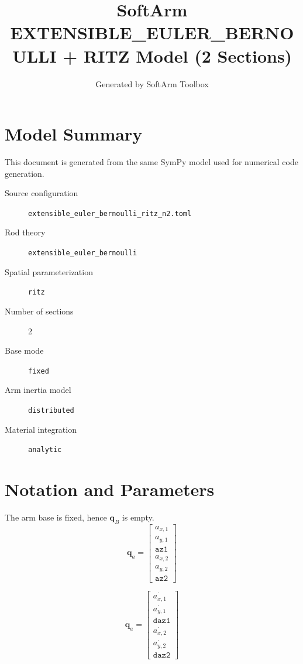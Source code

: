 \documentclass[11pt]{article}
\title{SoftArm EXTENSIBLE\_EULER\_BERNOULLI + RITZ Model (2 Sections)}
\author{Generated by SoftArm Toolbox}
\date{}
\begin{document}
\maketitle

\section{Model Summary}
This document is generated from the same SymPy model used for numerical code generation.
\begin{description}
\item[Source configuration] \texttt{extensible\_euler\_bernoulli\_ritz\_n2.toml}
\item[Rod theory] \texttt{extensible\_euler\_bernoulli}
\item[Spatial parameterization] \texttt{ritz}
\item[Number of sections] 2
\item[Base mode] \texttt{fixed}
\item[Arm inertia model] \texttt{distributed}
\item[Material integration] \texttt{analytic}
\end{description}

\section{Notation and Parameters}
The arm base is fixed, hence $\boldsymbol q_B$ is empty.
\begin{equation}
\boldsymbol q_a=\begin{bmatrix}a_{x,1}\\a_{y,1}\\\mathtt{az1}\\a_{x,2}\\a_{y,2}\\\mathtt{az2}\end{bmatrix}
\end{equation}

\begin{equation}
\dot{\boldsymbol q}_a=\begin{bmatrix}\dot{a_{x,1}}\\\dot{a_{y,1}}\\\mathtt{daz1}\\\dot{a_{x,2}}\\\dot{a_{y,2}}\\\mathtt{daz2}\end{bmatrix}
\end{equation}
\end{document}
